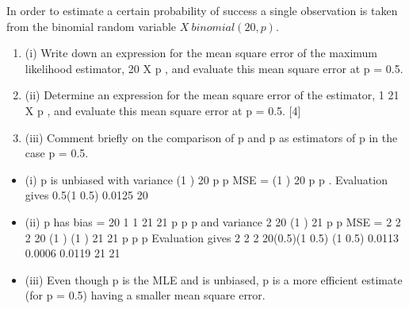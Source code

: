 \documentclass[a4paper,12pt]{article}
\begin{document}
In order to estimate a certain probability of success a single observation is taken from
the binomial random variable $X ~ binomial(20, p)$.
\begin{enumerate}
\item (i) Write down an expression for the mean square error of the maximum
likelihood estimator,
20
X
p , and evaluate this mean square error at p = 0.5.

\item (ii) Determine an expression for the mean square error of the estimator,
1
21
X
p , and evaluate this mean square error at p = 0.5. [4]
\item (iii) Comment briefly on the comparison of p and p as estimators of p in the case
p = 0.5. 
\end{enumerate}

\begin{itemize}
    \item (i) p is unbiased with variance
(1 )
20
p p
MSE =
(1 )
20
p p
.
Evaluation gives
0.5(1 0.5)
0.0125
20
    \item (ii) p has bias =
20 1 1
21 21
p p
p and variance 2
20 (1 )
21
p p
MSE =
2
2 2
20 (1 ) (1 )
21 21
p p p
Evaluation gives
2
2 2
20(0.5)(1 0.5) (1 0.5)
0.0113 0.0006 0.0119
21 21
    \item (iii) Even though p is the MLE and is unbiased, p is a more efficient estimate
(for p = 0.5) having a smaller mean square error.

\end{itemize}
\end{document}
